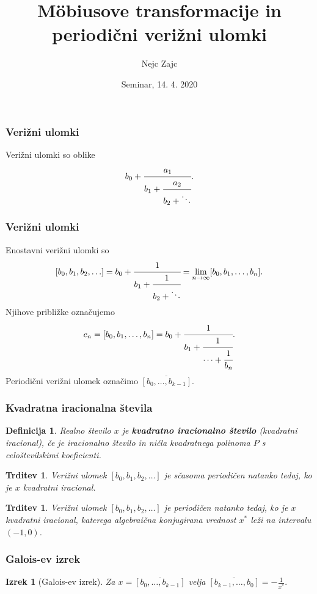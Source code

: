 \documentclass{beamer}
\title{M\"obiusove transformacije in periodični verižni ulomki}
\author[Nejc Zajc]{Nejc Zajc}
\date{Seminar, 14. 4. 2020}
\newtheorem{izrek}[theorem]{Izrek}
\newtheorem{trditev}[theorem]{Trditev}
\newtheorem{definicija}{Definicija}
\begin{document}
\begin{frame}
\maketitle

\end{frame}

\begin{frame}
\frametitle{Verižni ulomki}
Verižni ulomki so oblike
\[
    b_0 + \cfrac{a_1}{b_1 + \cfrac{a_2}{b_2 + \ddots}}.
\]  

\end{frame}
\begin{frame}
\frametitle{Verižni ulomki}
Enostavni verižni ulomki so 
\[
    [b_0, b_1, b_2, \ldots] = b_0 + \cfrac{1}{b_1 + \cfrac{1}{b_2 + \ddots}} = \lim_{n \to \infty} [b_0, b_1, \ldots, b_n].
\]
Njihove približke označujemo
\[
    c_n = [b_0, b_1, \ldots, b_n] = b_0 + \cfrac{1}{b_1 + \cfrac{1}{\cdots + \cfrac{1}{b_n}}}.
\]
Periodični verižni ulomek označimo $\overline{[b_0, \ldots, b_{k-1}]}$.





\end{frame}
\begin{frame}
\frametitle{Kvadratna iracionalna števila}
\begin{definicija}
    Realno število $x$ je \textbf{kvadratno iracionalno število} (kvadratni iracional), če je iracionalno število in ničla kvadratnega polinoma $P$ s celoštevilskimi koeficienti.
\end{definicija}
\pause
\begin{trditev}
    Verižni ulomek $[b_0, b_1, b_2, \ldots]$ je sčasoma periodičen natanko tedaj, ko je $x$ kvadratni iracional.
\end{trditev}
\pause
\begin{trditev}
    Verižni ulomek $[b_0, b_1, b_2, \ldots]$ je periodičen natanko tedaj, ko je $x$ kvadratni iracional, katerega algebraična konjugirana vrednost $x^*$ leži na intervalu $(-1, 0)$.
\end{trditev} 




\end{frame}

\begin{frame}
\frametitle{Galois-ev izrek}
\begin{izrek}[Galois-ev izrek]
    \label{Galois}
    Za $x = \overline{[b_0, \ldots, b_{k-1}]}$ velja $\overline{[b_{k-1}, \ldots, b_0]} = - \frac{1}{x^*}.$
\end{izrek}
\end{frame}
\end{document}
